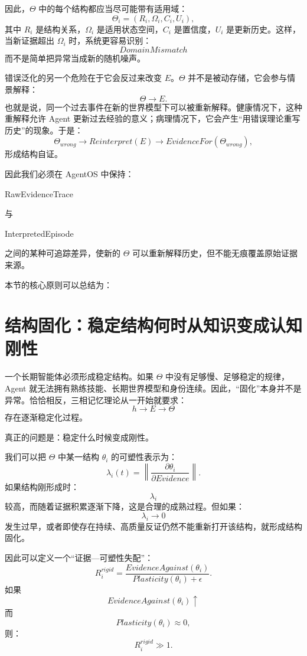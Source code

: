 因此，$\Theta$ 中的每个结构都应当尽可能带有适用域：
\[
\Theta_i
=
(R_i,\Omega_i,C_i,U_i),
\]
其中 $R_i$ 是结构关系，$\Omega_i$ 是适用状态空间，$C_i$ 是置信度，$U_i$ 是更新历史。这样，当新证据超出 $\Omega_i$ 时，系统更容易识别：
\[
DomainMismatch
\]
而不是简单把异常当成新的随机噪声。

错误泛化的另一个危险在于它会反过来改变 $E$。$\Theta$ 并不是被动存储，它会参与情景解释：
\[
\Theta\rightarrow E.
\]
也就是说，同一个过去事件在新的世界模型下可以被重新解释。健康情况下，这种重解释允许 Agent 更新过去经验的意义；病理情况下，它会产生“用错误理论重写历史”的现象。于是：
\[
\Theta_{wrong}
\rightarrow
Reinterpret(E)
\rightarrow
EvidenceFor(\Theta_{wrong}),
\]
形成结构自证。

因此我们必须在 AgentOS 中保持：
\begin{statementbox}
RawEvidenceTrace
\end{statementbox}
与
\begin{statementbox}
InterpretedEpisode
\end{statementbox}
之间的某种可追踪差异，使新的 $\Theta$ 可以重新解释历史，但不能无痕覆盖原始证据来源。

本节的核心原则可以总结为：
\begin{statementbox}
\centering
{}
\end{statementbox}

\section{结构固化：稳定结构何时从知识变成认知刚性}
\label{sec:structural-rigidity}

一个长期智能体必须形成稳定结构。如果 $\Theta$ 中没有足够慢、足够稳定的规律，Agent 就无法拥有熟练技能、长期世界模型和身份连续。因此，“固化”本身并不是异常。恰恰相反，三相记忆理论从一开始就要求：
\[
h\rightarrow E\rightarrow\Theta
\]
存在逐渐稳定化过程。

真正的问题是：稳定什么时候变成刚性。

我们可以把 $\Theta$ 中某一结构 $\theta_i$ 的可塑性表示为：
\[
\lambda_i(t)
=
\left\|
\frac{\partial \theta_i}
{\partial Evidence}
\right\|.
\]
如果结构刚形成时：
\[
\lambda_i
\]
较高，而随着证据积累逐渐下降，这是合理的成熟过程。但如果：
\[
\lambda_i\rightarrow 0
\]
发生过早，或者即使存在持续、高质量反证仍然不能重新打开该结构，就形成结构固化。

因此可以定义一个“证据—可塑性失配”：
\[
R_i^{rigid}
=
\frac{
EvidenceAgainst(\theta_i)
}{
Plasticity(\theta_i)+\epsilon
}.
\]
如果
\[
EvidenceAgainst(\theta_i)\uparrow
\]
而
\[
Plasticity(\theta_i)\approx 0,
\]
则：
\[
R_i^{rigid}\gg 1.
\]

